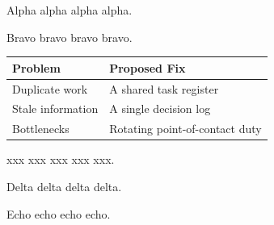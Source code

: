 \documentclass[10pt]{article}
\begin{document}
Alpha alpha alpha alpha.

Bravo bravo bravo bravo.

\begin{tabular}{|l|l|}
\hline
Problem & Proposed Fix \\
\hline
Duplicate work & A shared task register \\
Stale information & A single decision log \\
Bottlenecks & Rotating point-of-contact duty \\
\hline
\end{tabular}

xxx xxx xxx xxx xxx.

Delta delta delta delta.

Echo echo echo echo.
\end{document}
